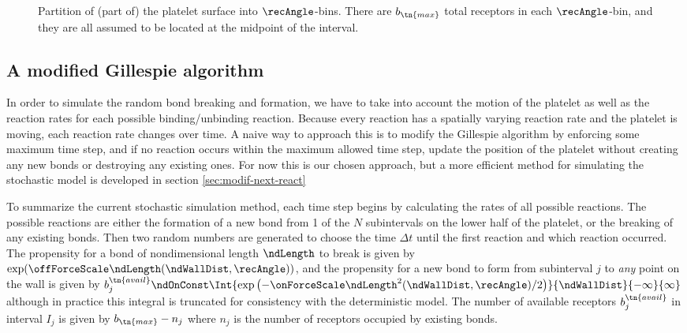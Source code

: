 \begin{figure}
  \centering
  
  \caption[Partition of (part of) the platelet surface into
  $\recAngle$-bins.]{Partition of (part of) the platelet surface into
    $\recAngle$-bins. There are $b_\tn{max}$ total receptors in each
    $\recAngle$-bin, and they are all assumed to be located at the
    midpoint of the interval.}
  \label{fig:plt-bins}
\end{figure}

\subsection{A modified Gillespie algorithm}
\label{sec:modif-gill-algor}

In order to simulate the random bond breaking and formation, we have
to take into account the motion of the platelet as well as the
reaction rates for each possible binding/unbinding reaction. Because
every reaction has a spatially varying reaction rate and the platelet
is moving, each reaction rate changes over time. A naive way to
approach this is to modify the Gillespie algorithm by enforcing some
maximum time step, and if no reaction occurs within the maximum
allowed time step, update the position of the platelet without
creating any new bonds or destroying any existing ones. For now this
is our chosen approach, but a more efficient method for simulating the
stochastic model is developed in section \ref{sec:modif-next-react}

To summarize the current stochastic simulation method, each time step
begins by calculating the rates of all possible reactions. The
possible reactions are either the formation of a new bond from 1 of
the $N$ subintervals on the lower half of the platelet, or the
breaking of any existing bonds. Then two random numbers are generated
to choose the time $\Delta t$ until the first reaction and which
reaction occurred. The propensity for a bond of nondimensional length
$\ndLength$ to break is given by
$\exp(\offForceScale \ndLength(\ndWallDist, \recAngle))$, and the
propensity for a new bond to form from subinterval $j$ to \emph{any}
point on the wall is given by
$b_j^\tn{avail} \ndOnConst\Int{\exp\left(-\onForceScale \ndLength^2
  (\ndWallDist, \recAngle)/2\right)} {\ndWallDist} {-\infty} {\infty}$
although in practice this integral is truncated for consistency with
the deterministic model. The number of available receptors
$b_j^\tn{avail}$ in interval $I_j$ is given by $b_\tn{max} - n_j$
where $n_j$ is the number of receptors occupied by existing bonds.

